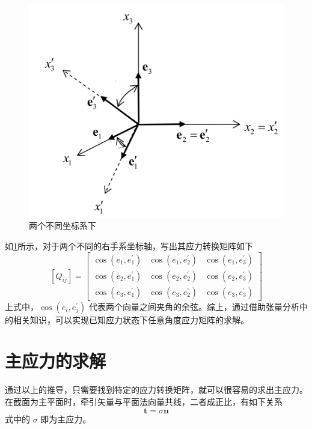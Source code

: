 \documentclass[12pt, a4paper]{ctexart}
\begin{document}
\begin{figure}
	\centering
	\includegraphics[scale=0.8]{26.png}
	\caption{两个不同坐标系下}
	\label{fig26}
\end{figure}

如\ref{fig26}所示，对于两个不同的右手系坐标轴，写出其应力转换矩阵如下
\begin{equation}
\left[Q_{i j}\right]=\left[ \begin{array}{ccc}{\cos \left(e_{1}, e_{1}^{\prime}\right)} & {\cos \left(e_{1}, e_{2}^{\prime}\right)} & {\cos \left(e_{1}, e_{3}^{\prime}\right)} \\ {\cos \left(e_{2}, e_{1}^{\prime}\right)} & {\cos \left(e_{2}, e_{2}^{\prime}\right)} & {\cos \left(e_{2}, e_{3}^{\prime}\right)} \\ {\cos \left(e_{3}, e_{1}^{\prime}\right)} & {\cos \left(e_{3}, e_{2}^{\prime}\right)} & {\cos \left(e_{3}, e_{3}^{\prime}\right)}\end{array}\right]
\end{equation}
上式中，$ \cos \left(e_{i}, e_{j}^{\prime}\right) $ 代表两个向量之间夹角的余弦。综上，通过借助张量分析中的相关知识，可以实现已知应力状态下任意角度应力矩阵的求解。

\section{主应力的求解}
通过以上的推导，只需要找到特定的应力转换矩阵，就可以很容易的求出主应力。\citep{mit}在截面为主平面时，牵引矢量与平面法向量共线，二者成正比，有如下关系
\begin{equation} \label{eq3}
\mathbf{t}=\sigma \mathbf{n}
\end{equation}
式中的 $ \sigma $ 即为主应力。
\end{document}
